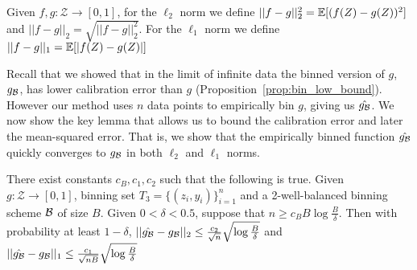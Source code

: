 \begin{definition}
Given $f, g : \mathcal{Z} \to [0, 1]$, for the $\ell_2$ norm we define $||f - g||_2^2 = \mathbb{E}[(f(Z) - g(Z))^2]$ and $||f- g||_2 = \sqrt{||f - g||_2^2}$. For the $\ell_1$ norm we define $||f - g||_1 = \mathbb{E}[\lvert f(Z) - g(Z)\rvert]$
\end{definition}

Recall that we showed that in the limit of infinite data the binned version of $g$, $g_{\mathcal{B}{}}$, has lower calibration error than $g$ (Proposition~\ref{prop:bin_low_bound}). However our method uses $n$ data points to empirically bin $g$, giving us $\hat{g_{\mathcal{B}{}}}$. We now show the key lemma that allows us to bound the calibration error and later the mean-squared error. That is, we show that the empirically binned function $\hat{g_{\mathcal{B}{}}}$ quickly converges to $g_{\mathcal{B}{}}$ in both $\ell_2$ and $\ell_1$ norms.

\begin{lemma}
\label{thm:empirical-binning}
There exist constants $c_B, c_1, c_2$ such that the following is true. Given $g : \mathcal{Z} \to [0, 1]$, binning set $T_3 = \{(z_i, y_i)\}_{i=1}^n$ and a 2-well-balanced binning scheme $\mathcal{B}{}$ of size $B$. Given $0 < \delta < 0.5$, suppose that $n \geq c_B B\log{\frac{B}{\delta}}$. Then with probability at least $1 - \delta$,  $||\hat{g_{\mathcal{B}{}}} - g_{\mathcal{B}{}}||_2 \leq \frac{c_2}{\sqrt{n}}\sqrt{\log{\frac{B}{\delta}}}$ and $||\hat{g_{\mathcal{B}{}}} - g_{\mathcal{B}{}}||_1 \leq \frac{c_1}{\sqrt{nB}}\sqrt{\log{\frac{B}{\delta}}}$
\end{lemma}

